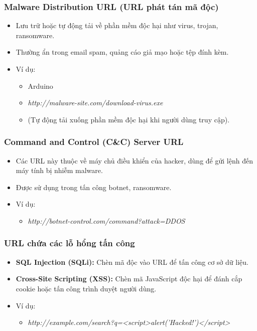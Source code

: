 \documentclass[13pt]{article}
\begin{document}
\subsubsection{Malware Distribution URL (URL phát tán mã độc)}
\begin{itemize}
    \item Lưu trữ hoặc tự động tải về phần mềm độc hại như virus, trojan, ransomware.
    \item Thường ẩn trong email spam, quảng cáo giả mạo hoặc tệp đính kèm.
    \item Ví dụ:
    \begin{itemize}
        \item Arduino
        \item \textit{http://malware-site.com/download-virus.exe}
        \item (Tự động tải xuống phần mềm độc hại khi người dùng truy cập).
    \end{itemize}
\end{itemize}

\subsubsection{Command and Control (C&C) Server URL}
\begin{itemize}
    \item Các URL này thuộc về máy chủ điều khiển của hacker, dùng để gửi lệnh đến máy tính bị nhiễm malware.
    \item Được sử dụng trong tấn công botnet, ransomware.
    \item Ví dụ:
    \begin{itemize}
        \item \textit{http://botnet-control.com/command?attack=DDOS}
    \end{itemize}
\end{itemize}

\subsubsection{URL chứa các lỗ hổng tấn công}
\begin{itemize}
    \item \textbf{SQL Injection (SQLi): } Chèn mã độc vào URL để tấn công cơ sở dữ liệu.
    \item \textbf{Cross-Site Scripting (XSS): } Chèn mã JavaScript độc hại để đánh cắp cookie hoặc tấn công trình duyệt người dùng.
    \item Ví dụ:
    \begin{itemize}
        \item \textit{http://example.com/search?q=<script>alert('Hacked!')</script>}
    \end{itemize}
\end{itemize}
\end{document}
